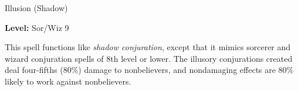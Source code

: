 
Illusion (Shadow)

\textbf{Level:} Sor/Wiz 9

This spell functions like \textit{shadow conjuration}, except that it mimics sorcerer 
and wizard conjuration spells of 8th level or lower. The illusory conjurations 
created deal four-fifths (80\%) damage to nonbelievers, and nondamaging effects 
are 80\% likely to work against nonbelievers.

